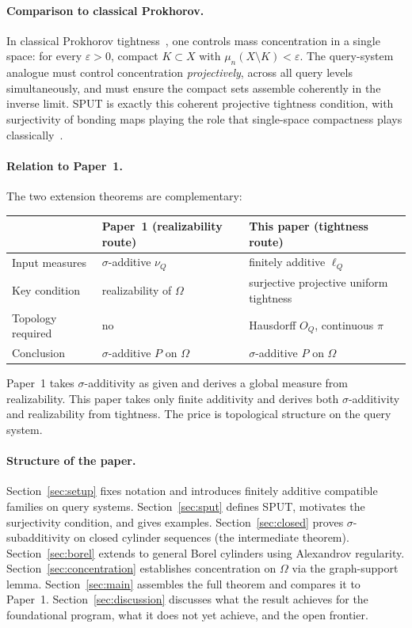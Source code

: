 \paragraph{Comparison to classical Prokhorov.}
In classical Prokhorov tightness~\cite{Prokhorov1956}, one controls mass concentration in
a single space: for every $\varepsilon > 0$, compact $K \subset X$
with $\mu_n(X \setminus K) < \varepsilon$.  The query-system
analogue must control concentration \emph{projectively}, across all
query levels simultaneously, and must ensure the compact sets
assemble coherently in the inverse limit.  SPUT is exactly this
coherent projective tightness condition, with surjectivity of
bonding maps playing the role that single-space compactness plays
classically~\cite{Parthasarathy1967}.

\paragraph{Relation to Paper~1.}
The two extension theorems are complementary:

\begin{center}
\begin{tabular}{lll}
\toprule
& Paper~1 (realizability route) & This paper (tightness route) \\
\midrule
Input measures & $\sigma$-additive $\nu_Q$ & finitely additive $\ell_Q$ \\
Key condition & realizability of $\Omega$ & surjective projective uniform tightness \\
Topology required & no & Hausdorff $O_Q$, continuous $\pi$ \\
Conclusion & $\sigma$-additive $P$ on $\Omega$ & $\sigma$-additive $P$ on $\Omega$ \\
\bottomrule
\end{tabular}
\end{center}

\noindent
Paper~1 takes $\sigma$-additivity as given and derives a global
measure from realizability.  This paper takes only finite additivity
and derives both $\sigma$-additivity and realizability from tightness.
The price is topological structure on the query system.

\paragraph{Structure of the paper.}
Section~\ref{sec:setup} fixes notation and introduces finitely
additive compatible families on query systems.
Section~\ref{sec:sput} defines SPUT, motivates the surjectivity
condition, and gives examples.
Section~\ref{sec:closed} proves $\sigma$-subadditivity on closed
cylinder sequences (the intermediate theorem).
Section~\ref{sec:borel} extends to general Borel cylinders using
Alexandrov regularity.
Section~\ref{sec:concentration} establishes concentration on $\Omega$
via the graph-support lemma.
Section~\ref{sec:main} assembles the full theorem and compares it to
Paper~1.
Section~\ref{sec:discussion} discusses what the result achieves for
the foundational program, what it does not yet achieve, and the
open frontier.

